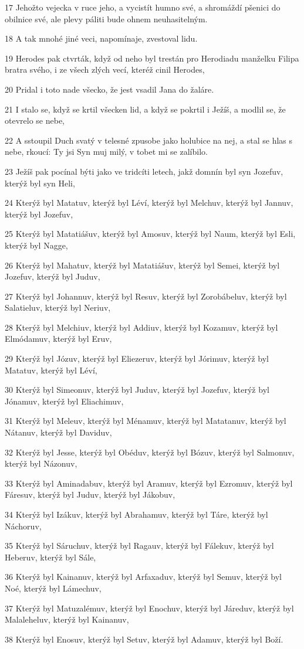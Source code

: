 \par 17 Jehožto vejecka v ruce jeho, a vycistít humno své, a shromáždí pšenici do obilnice své, ale plevy páliti bude ohnem neuhasitelným.
\par 18 A tak mnohé jiné veci, napomínaje, zvestoval lidu.
\par 19 Herodes pak ctvrták, když od neho byl trestán pro Herodiadu manželku Filipa bratra svého, i ze všech zlých vecí, kteréž cinil Herodes,
\par 20 Pridal i toto nade všecko, že jest vsadil Jana do žaláre.
\par 21 I stalo se, když se krtil všecken lid, a když se pokrtil i Ježíš, a modlil se, že otevrelo se nebe,
\par 22 A sstoupil Duch svatý v telesné zpusobe jako holubice na nej, a stal se hlas s nebe, rkoucí: Ty jsi Syn muj milý, v tobet mi se zalíbilo.
\par 23 Ježíš pak pocínal býti jako ve tridcíti letech, jakž domnín byl syn Jozefuv, kterýž byl syn Heli,
\par 24 Kterýž byl Matatuv, kterýž byl Léví, kterýž byl Melchuv, kterýž byl Jannuv, kterýž byl Jozefuv,
\par 25 Kterýž byl Matatiášuv, kterýž byl Amosuv, kterýž byl Naum, kterýž byl Esli, kterýž byl Nagge,
\par 26 Kterýž byl Mahatuv, kterýž byl Matatiášuv, kterýž byl Semei, kterýž byl Jozefuv, kterýž byl Juduv,
\par 27 Kterýž byl Johannuv, kterýž byl Resuv, kterýž byl Zorobábeluv, kterýž byl Salatieluv, kterýž byl Neriuv,
\par 28 Kterýž byl Melchiuv, kterýž byl Addiuv, kterýž byl Kozamuv, kterýž byl Elmódamuv, kterýž byl Eruv,
\par 29 Kterýž byl Józuv, kterýž byl Eliezeruv, kterýž byl Jórimuv, kterýž byl Matatuv, kterýž byl Léví,
\par 30 Kterýž byl Simeonuv, kterýž byl Juduv, kterýž byl Jozefuv, kterýž byl Jónamuv, kterýž byl Eliachimuv,
\par 31 Kterýž byl Meleuv, kterýž byl Ménamuv, kterýž byl Matatanuv, kterýž byl Nátanuv, kterýž byl Daviduv,
\par 32 Kterýž byl Jesse, kterýž byl Obéduv, kterýž byl Bózuv, kterýž byl Salmonuv, kterýž byl Názonuv,
\par 33 Kterýž byl Aminadabuv, kterýž byl Aramuv, kterýž byl Ezromuv, kterýž byl Fáresuv, kterýž byl Juduv, kterýž byl Jákobuv,
\par 34 Kterýž byl Izákuv, kterýž byl Abrahamuv, kterýž byl Táre, kterýž byl Náchoruv,
\par 35 Kterýž byl Sáruchuv, kterýž byl Ragauv, kterýž byl Fálekuv, kterýž byl Heberuv, kterýž byl Sále,
\par 36 Kterýž byl Kainanuv, kterýž byl Arfaxaduv, kterýž byl Semuv, kterýž byl Noé, kterýž byl Lámechuv,
\par 37 Kterýž byl Matuzalémuv, kterýž byl Enochuv, kterýž byl Járeduv, kterýž byl Malaleheluv, kterýž byl Kainanuv,
\par 38 Kterýž byl Enosuv, kterýž byl Setuv, kterýž byl Adamuv, kterýž byl Boží.

